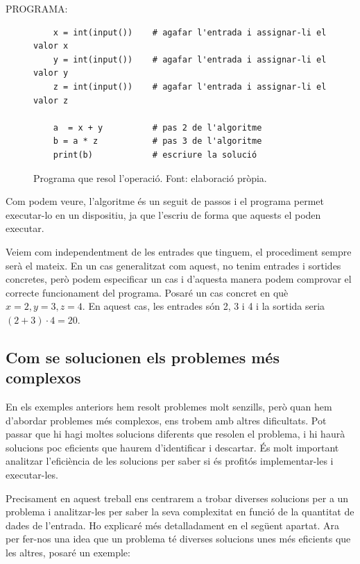 PROGRAMA:
\begin{figure}[h]
    \begin{verbatim}
    x = int(input())    # agafar l'entrada i assignar-li el valor x
    y = int(input())    # agafar l'entrada i assignar-li el valor y
    z = int(input())    # agafar l'entrada i assignar-li el valor z
    
    a  = x + y          # pas 2 de l'algoritme
    b = a * z           # pas 3 de l'algoritme
    print(b)            # escriure la solució
    \end{verbatim}
    \caption[Programa que resol l'operació.]{Programa que resol l'operació\footnotemark. Font: elaboració pròpia.}
    \label{Figura}
\end{figure}

Com podem veure, l'algoritme és un seguit de passos i el programa permet executar-lo en un dispositiu, ja que l'escriu de forma que aquests el poden executar.

\newpage Veiem com independentment de les entrades que tinguem, el procediment sempre serà el mateix. En un cas generalitzat com aquest, no tenim entrades i sortides concretes, però podem especificar un cas i d'aquesta manera podem comprovar el correcte funcionament del programa. Posaré un cas concret en què $x = 2, y = 3, z = 4$. En aquest cas, les entrades són 2, 3 i 4 i la sortida seria $(2+3)\cdot4 = 20$.

\subsection{Com se solucionen els problemes més complexos}
En els exemples anteriors hem resolt problemes molt senzills, però quan hem d'abordar problemes més complexos, ens trobem amb altres dificultats. Pot passar que hi hagi moltes solucions diferents que resolen el problema, i hi haurà solucions poc eficients que haurem d'identificar i descartar. És molt important analitzar l'eficiència de les solucions per saber si és profitós implementar-les i executar-les.

Precisament en aquest treball ens centrarem a trobar diverses solucions per a un problema i analitzar-les per saber la seva complexitat en funció de la quantitat de dades de l'entrada. Ho explicaré més detalladament en el següent apartat. Ara per fer-nos una idea que un problema té diverses solucions unes més eficients que les altres, posaré un exemple:

